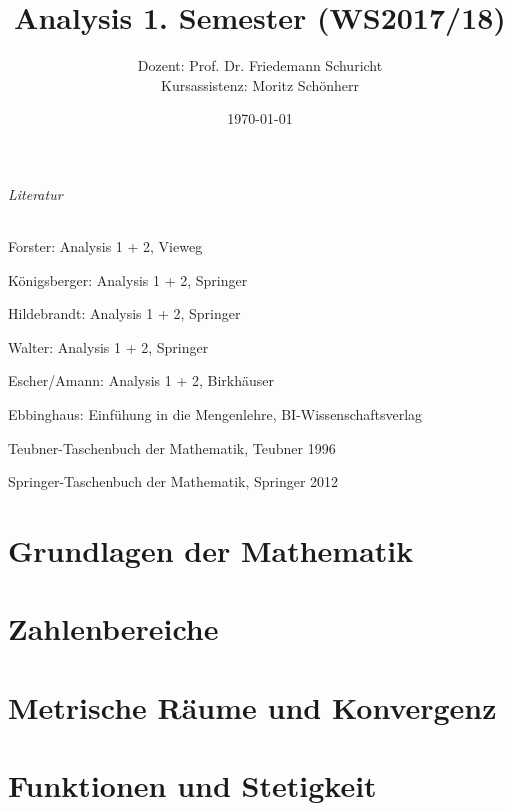 \documentclass[11pt]{book}
\begin{document}
\title{\textbf{Analysis 1. Semester (WS2017/18)}}
\author{Dozent: Prof. Dr. Friedemann Schuricht\\
	Kursassistenz: Moritz Schönherr}
\date{\today}

\frontmatter
\maketitle
\tableofcontents

\newpage
\paragraph{Literatur}
\begin{compactitem}
	\item Forster: Analysis 1 + 2, Vieweg
	\item Königsberger: Analysis 1 + 2, Springer
	\item Hildebrandt: Analysis 1 + 2, Springer
	\item Walter: Analysis 1 + 2, Springer
	\item Escher/Amann: Analysis 1 + 2, Birkhäuser
	\item Ebbinghaus: Einfühung in die Mengenlehre, BI-Wissenschaftsverlag
	\item Teubner-Taschenbuch der Mathematik, Teubner 1996
	\item Springer-Taschenbuch der Mathematik, Springer 2012
\end{compactitem}

\mainmatter
\part{Grundlagen der Mathematik}


\part{Zahlenbereiche}




\part{Metrische Räume und Konvergenz}






\part{Funktionen und Stetigkeit}


\backmatter
\end{document}
